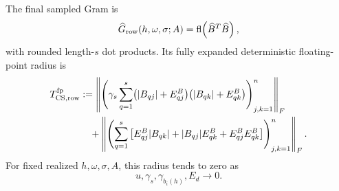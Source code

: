 \documentclass[11pt]{article}
\newcommand{\Frob}[1]{\left\lVert #1\right\rVert_F}
\newcommand{\fl}{\operatorname{fl}}
\theoremstyle{remark}
\begin{document}
The final sampled Gram is
\[
  \widehat G_{\rm row}(h,\omega,\sigma;A)
  =
  \fl\!\left(\widehat B^T\widehat B\right),
\]
with rounded length-\(s\) dot products.  Its fully expanded deterministic
floating-point radius is
\[
\begin{aligned}
  T_{\rm CS,row}^{\rm fp}
  &:=
  \Frob{
    \left(
      \gamma_s
      \sum_{q=1}^{s}
        \bigl(|B_{qj}|+E^B_{qj}\bigr)
        \bigl(|B_{qk}|+E^B_{qk}\bigr)
    \right)_{j,k=1}^{n}
  }
  \\
  &\quad+
  \Frob{
    \left(
      \sum_{q=1}^{s}
      \left[
        E^B_{qj}|B_{qk}|
        +
        |B_{qj}|E^B_{qk}
        +
        E^B_{qj}E^B_{qk}
      \right]
    \right)_{j,k=1}^{n}
  } .
\end{aligned}
\]
For fixed realized \(h,\omega,\sigma,A\), this radius tends to zero as
\[
  u,\gamma_s,\gamma_{b_i(h)},E_d\longrightarrow0 .
\]
\end{document}
